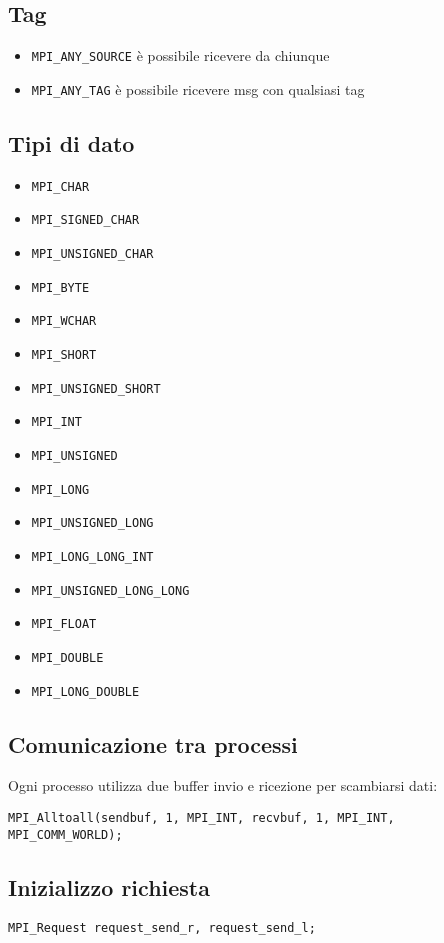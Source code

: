 \documentclass{article}
\begin{document}
\subsection{Tag}
\begin{itemize}
    \item \texttt{MPI\_ANY\_SOURCE} è possibile ricevere da chiunque
    \item \texttt{MPI\_ANY\_TAG} è possibile ricevere msg con qualsiasi tag
\end{itemize}

\subsection{Tipi di dato}
\begin{itemize}
    \item \texttt{MPI\_CHAR}
    \item \texttt{MPI\_SIGNED\_CHAR}
    \item \texttt{MPI\_UNSIGNED\_CHAR}
    \item \texttt{MPI\_BYTE}
    \item \texttt{MPI\_WCHAR}
    \item \texttt{MPI\_SHORT}
    \item \texttt{MPI\_UNSIGNED\_SHORT}
    \item \texttt{MPI\_INT}
    \item \texttt{MPI\_UNSIGNED}
    \item \texttt{MPI\_LONG}
    \item \texttt{MPI\_UNSIGNED\_LONG}
    \item \texttt{MPI\_LONG\_LONG\_INT}
    \item \texttt{MPI\_UNSIGNED\_LONG\_LONG}
    \item \texttt{MPI\_FLOAT}
    \item \texttt{MPI\_DOUBLE}
    \item \texttt{MPI\_LONG\_DOUBLE}
\end{itemize}

\subsection{Comunicazione tra processi}
Ogni processo utilizza due buffer invio e ricezione per scambiarsi dati:
\begin{verbatim}
MPI_Alltoall(sendbuf, 1, MPI_INT, recvbuf, 1, MPI_INT, MPI_COMM_WORLD);
\end{verbatim}

\subsection{Inizializzo richiesta}
\begin{verbatim}
MPI_Request request_send_r, request_send_l;
\end{verbatim}
\end{document}
